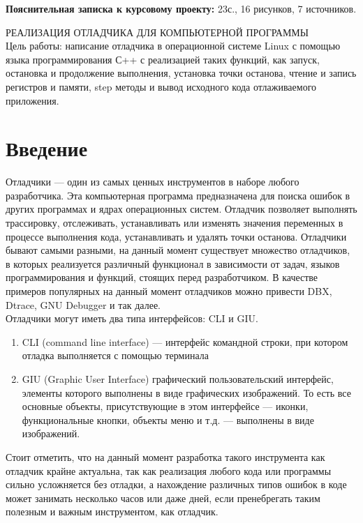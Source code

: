 \documentclass[a4paper,14pt,oneside]{extreport}  %
\begin{document}
\vskip12pt
{\bf Пояснительная записка к курсовому проекту: } {23с., 16 рисунков, 7 источников.}

 РЕАЛИЗАЦИЯ ОТЛАДЧИКА ДЛЯ КОМПЬЮТЕРНОЙ ПРОГРАММЫ\\

Цель работы: написание отладчика в операционной системе Linux с помощью языка программирования С++ с реализацией таких функций, как запуск, остановка и продолжение выполнения, установка точки останова, чтение и запись регистров и памяти, step методы и вывод исходного кода отлаживаемого приложения.

\newpage
\tableofcontents

\chapter*{Введение}
Отладчики — один из самых ценных инструментов в наборе любого разработчика. Эта компьютерная программа предназначена для поиска ошибок в других программах и ядрах операционных систем. Отладчик позволяет выполнять трассировку, отслеживать, устанавливать или изменять значения переменных в процессе выполнения кода, устанавливать и удалять точки останова.
Отладчики бывают самыми разными, на данный момент существует множество отладчиков, в которых реализуется различный функционал в зависимости от задач, языков программирования и функций, стоящих перед разработчиком. В качестве примеров популярных на данный момент отладчиков можно привести DBX, Dtrace, GNU Debugger и так далее.\\

Отладчики могут иметь два типа интерфейсов: CLI и GIU.
\begin{enumerate}
	\item CLI (command line interface) — интерфейс командной строки, при котором отладка выполняется с помощью терминала
	\item GIU (Graphic User Interface) графический пользовательский интерфейс, элементы которого выполнены в виде графических изображений. То есть все основные объекты, присутствующие в этом интерфейсе — иконки, функциональные кнопки, объекты меню и т.д. — выполнены в виде изображений.
\end{enumerate}

Стоит отметить, что на данный момент разработка такого инструмента как отладчик крайне актуальна, так как реализация любого кода или программы сильно усложняется без отладки, а нахождение различных типов ошибок в коде может занимать несколько часов или даже дней, если пренебрегать таким полезным и важным инструментом, как отладчик.
\end{document}
